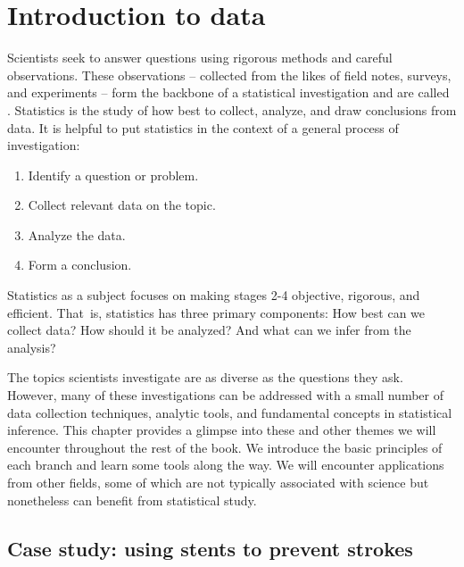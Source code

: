 \chapter{Introduction to data}
\label{introductionToData}
\label{ch_intro_to_data}


Scientists seek to answer questions using rigorous methods and careful observations. These observations -- collected from the likes of field notes, surveys, and experiments -- form the backbone of a statistical investigation and are called . Statistics is the study of how best to collect, analyze, and draw conclusions from data. It is helpful to put statistics in the context of a general process of investigation:
\begin{enumerate}
\setlength{\itemsep}{0mm}
\item Identify a question or problem.
\item Collect relevant data on the topic.
\item Analyze the data.
\item Form a conclusion.
\end{enumerate}
Statistics as a subject focuses on making stages 2-4 objective, rigorous, and efficient. That~is, statistics has three primary components: How best can we collect data? How should it be analyzed? And what can we infer from the analysis?

The topics scientists investigate are as diverse as the questions they ask. However, many of these investigations can be addressed with a small number of data collection techniques, analytic tools, and fundamental concepts in statistical inference. This chapter provides a glimpse into these and other themes we will encounter throughout the rest of the book. We introduce the basic principles of each branch and learn some tools along the way. We will encounter applications from other fields, some of which are not typically associated with science but nonetheless can benefit from statistical study.

\section[Case study: using stents to prevent strokes]{Case study: using stents to prevent strokes  }
\label{basicExampleOfStentsAndStrokes}

